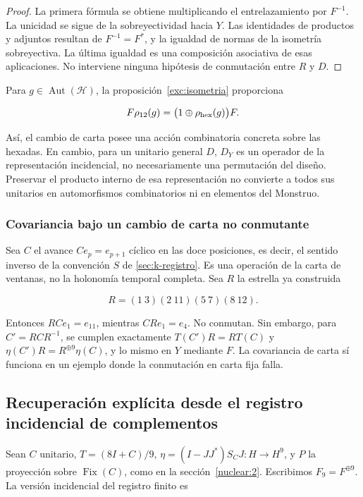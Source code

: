 \begin{proof}
La primera fórmula se obtiene multiplicando el entrelazamiento por \(F^{-1}\). La unicidad se sigue de la sobreyectividad hacia \(Y\). Las identidades de productos y adjuntos resultan de \(F^{-1}=F^*\), y la igualdad de normas de la isometría sobreyectiva. La última igualdad es una composición asociativa de esas aplicaciones. No interviene ninguna hipótesis de conmutación entre \(R\) y \(D\).
\end{proof}

Para \(g\in\operatorname{Aut}(\mathcal H)\), la proposición~\ref{exc:isometria} proporciona

\[
F\rho_{12}(g)=\bigl(1\oplus\rho_{\rm hex}(g)\bigr)F.
\]

Así, el cambio de carta posee una acción combinatoria concreta sobre las hexadas. En cambio, para un unitario general \(D\), \(D_Y\) es un operador de la representación incidencial, no necesariamente una permutación del diseño. Preservar el producto interno de esa representación no convierte a todos sus unitarios en automorfismos combinatorios ni en elementos del Monstruo.

\subsubsection{Covariancia bajo un cambio de carta no conmutante}

Sea \(C\) el avance \(Ce_p=e_{p+1}\) cíclico en las doce posiciones, es decir, el sentido inverso de la convención \(S\) de \cref{sec:k-registro}. Es una operación de la carta de ventanas, no la holonomía temporal completa. Sea \(R\) la estrella ya construida

\[
R=(1\ 3)(2\ 11)(5\ 7)(8\ 12).
\]

Entonces \(RCe_1=e_{11}\), mientras \(CRe_1=e_4\). No conmutan. Sin embargo, para \(C'=RCR^{-1}\), se cumplen exactamente \(T(C')R=RT(C)\) y \(\eta(C')R=R^{\oplus9}\eta(C)\), y lo mismo en \(Y\) mediante \(F\). La covariancia de carta sí funciona en un ejemplo donde la conmutación en carta fija falla.

\subsection{Recuperación explícita desde el registro incidencial de complementos}\label{nuc05:recuperacion}

Sean \(C\) unitario, \(T=(8I+C)/9\), \(\eta=(I-JJ^*)S_CJ:H\to H^9\), y \(P\) la proyección sobre \(\operatorname{Fix}(C)\), como en la sección~\ref{nuclear:2}. Escribimos \(F_9=F^{\oplus9}\). La versión incidencial del registro finito es

